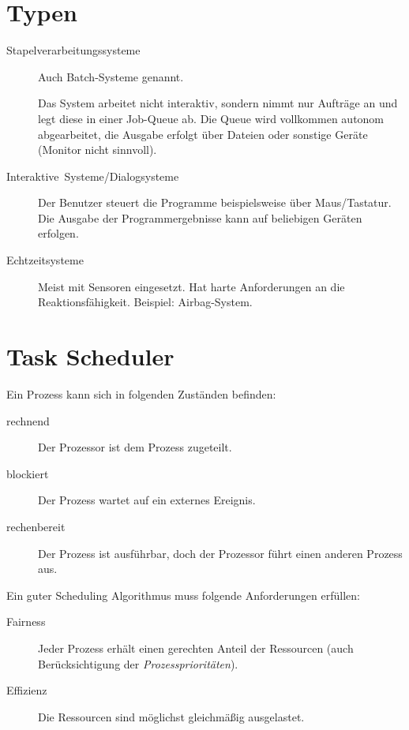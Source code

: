 \section{Typen}
\begin{description}
  \item [{Stapelverarbeitungssysteme}] 
	Auch Batch-Systeme genannt.

	Das System arbeitet nicht interaktiv, sondern nimmt nur Aufträge an und legt diese in einer Job-Queue ab.
	Die Queue wird vollkommen autonom abgearbeitet, die Ausgabe erfolgt über Dateien oder sonstige Geräte (Monitor nicht sinnvoll).

  \item [{Interaktive~Systeme/Dialogsysteme}] 
	Der Benutzer steuert die Programme beispielsweise über Maus\slash{}Tastatur.
	Die Ausgabe der Programmergebnisse kann auf beliebigen Geräten erfolgen.
  \item [{Echtzeitsysteme}] 
	Meist mit Sensoren eingesetzt.
	Hat harte Anforderungen an die Reaktionsfähigkeit.
	Beispiel: Airbag-System.
\end{description}

\section{\label{sec:Task-Scheduler}Task Scheduler}

Ein Prozess kann sich in folgenden Zuständen befinden:
\begin{description}
  \item [{rechnend}] 
	Der Prozessor ist dem Prozess zugeteilt.
  \item [{blockiert}] 
	Der Prozess wartet auf ein externes Ereignis.
  \item [{rechenbereit}] 
	Der Prozess ist ausführbar, doch der Prozessor führt einen anderen Prozess aus.
\end{description}

Ein guter \foreignlanguage{english}{Scheduling} Algorithmus muss folgende Anforderungen erfüllen:
\begin{description}
  \item [{Fairness}]  Jeder Prozess erhält einen gerechten Anteil der Ressourcen (auch Berücksichtigung der \emph{Prozessprioritäten}).
  \item [{Effizienz}] Die Ressourcen sind möglichst gleichmäßig ausgelastet.
\end{description}

